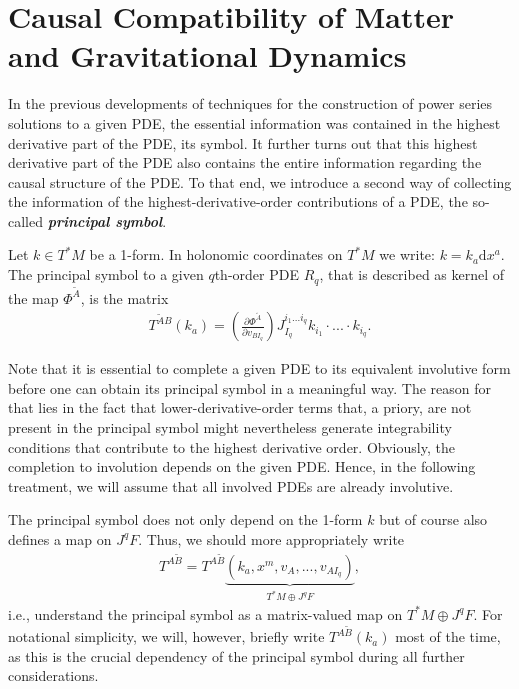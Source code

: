 \section{Causal Compatibility of Matter and Gravitational Dynamics}
In the previous developments of techniques for the construction of power series solutions to a given PDE, the essential information was contained in the highest derivative part of the PDE, its symbol. 
It further turns out that this highest derivative part of the PDE also contains the entire information regarding the causal structure of the PDE. To that end, we introduce a second way of collecting the information of the highest-derivative-order contributions of a PDE, the so-called \textbf{\textit{principal symbol}}.
\begin{definition} \label{PSym}
Let $ k \in T^{\ast}M$ be a  1-form. In holonomic coordinates on $T^{\ast}M$ we write: $k = k_{a} \mathrm{d}x^a$. The principal symbol to a given $q$th-order PDE $R_q$, that is described as kernel of the map $\Phi^{\tilde{A}}$, is the matrix
\begin{align}
    T^{\tilde{A} B}(k_a) = \left ( \frac{\partial \Phi^{\tilde{A}}}{\partial v_{BI_q}} \right ) J_{I_q}^{i_1...i_q} k_{i_1} \cdot ... \cdot k_{i_q}.
\end{align}
\end{definition}
\begin{remark}
Note that it is essential to complete a given PDE to its equivalent involutive form before one can obtain its principal symbol in a meaningful way. The reason for that lies in the fact that lower-derivative-order terms that, a priory, are not present in the principal symbol might nevertheless generate integrability conditions that contribute to the highest derivative order. Obviously, the completion to involution depends on the given PDE. Hence, in the following treatment, we will assume that all involved PDEs are already involutive.
\end{remark}
The principal symbol does not only depend on the 1-form $k$ but of course also defines a map on $J^qF$. Thus, we should more appropriately write
\begin{align}
    T^{A\tilde{B}} = T^{A\tilde{B}}\underbrace{(k_a,x^m,v_A,...,v_{AI_q})}_{T^{\ast}M \oplus J^qF},
\end{align}
i.e., understand the principal symbol as a matrix-valued map on $T^{\ast}M \oplus J^qF$. 
For notational simplicity, we will, however, briefly write $T^{A\tilde{B}}(k_a)$ most of the time, as this is the crucial dependency of the principal symbol during all further considerations.

